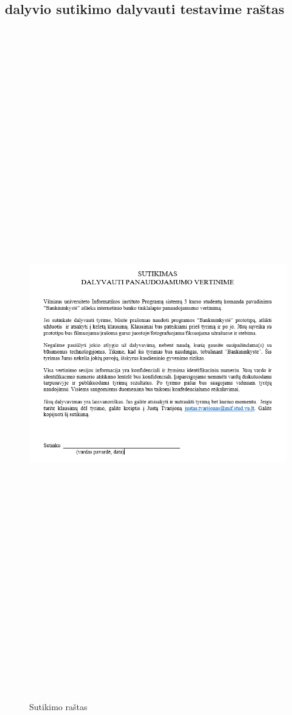 \documentclass[oneside]{VUMIFPSkursinis}
\begin{document}
\subsection{dalyvio sutikimo dalyvauti testavime raštas}
\begin{figure}[ht]
	\centering
	\includegraphics[width=16cm,height=70cm,keepaspectratio]{Sutikimas.png}
	\caption{Sutikimo raštas}
\end{figure}
\end{document}
